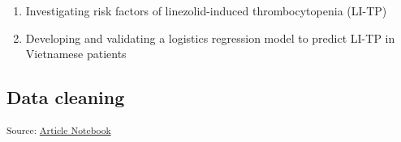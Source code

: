 \documentclass[
  letterpaper,
  DIV=11,
  numbers=noendperiod]{scrartcl}
\providecommand{\tightlist}{%
  \setlength{\itemsep}{0pt}\setlength{\parskip}{0pt}}\usepackage{longtable,booktabs,array}
\begin{document}
\begin{enumerate}
\def\labelenumi{\arabic{enumi}.}
\tightlist
\item
  Investigating risk factors of linezolid-induced thrombocytopenia
  (LI-TP)
\item
  Developing and validating a logistics regression model to predict
  LI-TP in Vietnamese patients
\end{enumerate}

\subsection{Data cleaning}\label{data-cleaning}

\textsubscript{Source:
\href{https://AnTangQuoc.github.io/LZD-TP-pred-model/index.qmd.html}{Article
Notebook}}
\end{document}
